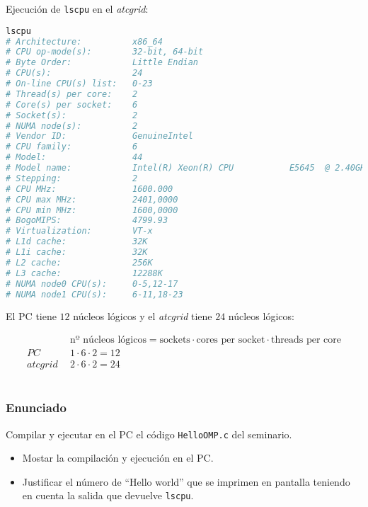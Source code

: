 \pagebreak

Ejecución de \texttt{lscpu} en el \textit{atcgrid}:

\begin{lstlisting}[language=sh]
lscpu
# Architecture:          x86_64
# CPU op-mode(s):        32-bit, 64-bit
# Byte Order:            Little Endian
# CPU(s):                24
# On-line CPU(s) list:   0-23
# Thread(s) per core:    2
# Core(s) per socket:    6
# Socket(s):             2
# NUMA node(s):          2
# Vendor ID:             GenuineIntel
# CPU family:            6
# Model:                 44
# Model name:            Intel(R) Xeon(R) CPU           E5645  @ 2.40GHz
# Stepping:              2
# CPU MHz:               1600.000
# CPU max MHz:           2401,0000
# CPU min MHz:           1600,0000
# BogoMIPS:              4799.93
# Virtualization:        VT-x
# L1d cache:             32K
# L1i cache:             32K
# L2 cache:              256K
# L3 cache:              12288K
# NUMA node0 CPU(s):     0-5,12-17
# NUMA node1 CPU(s):     6-11,18-23
\end{lstlisting}

El PC tiene $12$ núcleos lógicos y el \textit{atcgrid} tiene $24$ núcleos lógicos:

\[\begin{split}
           & \text{nº núcleos lógicos}=\text{sockets}\cdot\text{cores per socket}\cdot\text{threads per core}\\
PC\ \      & 1\cdot6\cdot2=12 \\
\textit{atcgrid}\ \ & 2\cdot6\cdot2=24
\end{split}\]

\section{}\label{ej1-2}

\subsubsection{Enunciado}

Compilar y ejecutar en el PC el código \texttt{HelloOMP.c} del seminario.

\begin{itemize}
	\item Mostar la compilación y ejecución en el PC\@.
	\item Justificar el número de ``Hello world'' que se imprimen en pantalla teniendo en cuenta la salida que devuelve \texttt{lscpu}.
\end{itemize}

